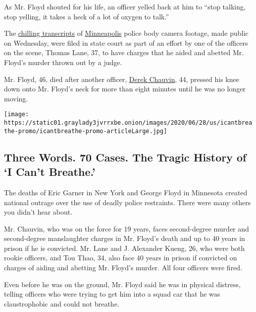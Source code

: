 As Mr. Floyd shouted for his life, an officer yelled back at him to
``stop talking, stop yelling, it takes a heck of a lot of oxygen to
talk.''

The
\href{https://int.graylady3jvrrxbe.onion/data/documenthelper/7070-exhibit-final07072020/4b81216735f2203a08cb/optimized/full.pdf\#page=1}{chilling
transcripts} of
\href{https://www.nytimes3xbfgragh.onion/2020/07/29/us/george-floyd-memorial.html}{Minneapolis}
police body camera footage, made public on Wednesday, were filed in
state court as part of an effort by one of the officers on the scene,
Thomas Lane, 37, to have charges that he aided and abetted Mr. Floyd's
murder thrown out by a judge.

Mr. Floyd, 46, died after another officer,
\href{https://www.nytimes3xbfgragh.onion/2020/07/18/us/derek-chauvin-george-floyd.html}{Derek
Chauvin}, 44, pressed his knee down onto Mr. Floyd's neck for more than
eight minutes until he was no longer moving.

\href{https://www.nytimes3xbfgragh.onion/interactive/2020/06/28/us/i-cant-breathe-police-arrest.html}{}

\texttt{[image: https://static01.graylady3jvrrxbe.onion/images/2020/06/28/us/icantbreathe-promo/icantbreathe-promo-articleLarge.jpg]}

\hypertarget{three-words-70-cases-the-tragic-history-of-i-cant-breathe}{%
\subsection{Three Words. 70 Cases. The Tragic History of `I Can't
Breathe.'}\label{three-words-70-cases-the-tragic-history-of-i-cant-breathe}}

The deaths of Eric Garner in New York and George Floyd in Minnesota
created national outrage over the use of deadly police restraints. There
were many others you didn't hear about.

Mr. Chauvin, who was on the force for 19 years, faces second-degree
murder and second-degree manslaughter charges in Mr. Floyd's death and
up to 40 years in prison if he is convicted. Mr. Lane and J. Alexander
Kueng, 26, who were both rookie officers, and Tou Thao, 34, also face 40
years in prison if convicted on charges of aiding and abetting Mr.
Floyd's murder. All four officers were fired.

Even before he was on the ground, Mr. Floyd said he was in physical
distress, telling officers who were trying to get him into a squad car
that he was claustrophobic and could not breathe.

